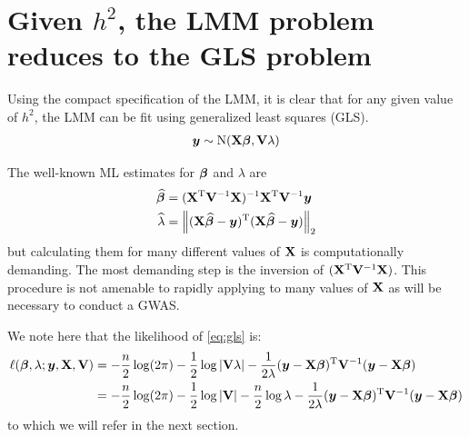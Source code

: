 




\section{Given \texorpdfstring{$h^2$}{h-squared}, the LMM problem reduces to the GLS problem}

Using the compact specification of the LMM, it is clear that for any given value of $h^2$, the LMM can be fit using generalized least squares (GLS).
\begin{align}
  \bm{y} \sim \mathrm{N}(\mathbf{X}\boldsymbol{\beta}, \mathbf{V} \lambda)     \label{eq:gls}
\end{align}

The well-known ML estimates for $\boldsymbol{\beta}$ and $\lambda$ are
\begin{align}
  \widehat{\boldsymbol{\beta}}    &= (\mathbf{X} ^\mathrm{T} \mathbf{V} ^{-1} \mathbf{X}) ^{-1} \mathbf{X} ^\mathrm{T} \mathbf{V} ^{-1} \bm{y}\\
  \widehat{\lambda}   &= \left\lVert(\mathbf{X}\widehat{\boldsymbol{\beta}} - \bm{y})^\mathrm{T}(\mathbf{X}\widehat{\boldsymbol{\beta}} - \bm{y})\right\rVert_{2}
\end{align}
but calculating them for many different values of $\mathbf{X}$ is computationally demanding.
The most demanding step is the inversion of $(\mathbf{X} ^\mathrm{T} \mathbf{V} ^{-1} \mathbf{X})$.
This procedure is not amenable to rapidly applying to many values of $\mathbf{X}$ as will be necessary to conduct a GWAS.

We note here that the likelihood of \cref{eq:gls} is:
\begin{align}
    \ell(\boldsymbol{\beta}, \lambda; \bm{y}, \mathbf{X}, \mathbf{V}) &= 
        -\frac{n}{2}\log(2\pi)
        -\frac{1}{2}\log|\mathbf{V}\lambda|
        -           \frac{1}{2\lambda}
            (\bm{y}-\mathbf{X}\boldsymbol{\beta})^\mathrm{T}\mathbf{V}^{-1}(\bm{y}-\mathbf{X}\boldsymbol{\beta}) \\
    &= 
        -\frac{n}{2}\log(2\pi)
        -\frac{1}{2}\log|\mathbf{V}|
        -\frac{n}{2}\log\lambda
        - \frac{1}{2\lambda}
            (\bm{y}-\mathbf{X}\boldsymbol{\beta})^\mathrm{T}\mathbf{V}^{-1}(\bm{y}-\mathbf{X}\boldsymbol{\beta}) \label{eq:lmm_loglik}
\end{align}
to which we will refer in the next section.

